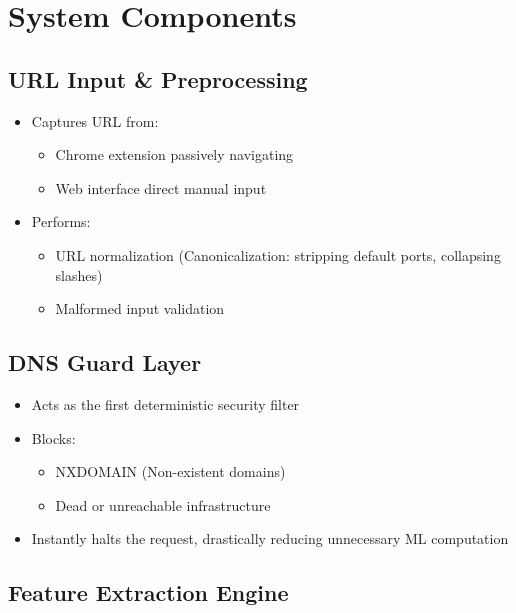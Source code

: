 \section{System Components}

\subsection{URL Input \& Preprocessing}

\begin{itemize}
    \item Captures URL from:
    \begin{itemize}
        \item Chrome extension passively navigating
        \item Web interface direct manual input
    \end{itemize}
    \item Performs:
    \begin{itemize}
        \item URL normalization (Canonicalization: stripping default ports, collapsing slashes)
        \item Malformed input validation
    \end{itemize}
\end{itemize}

\subsection{DNS Guard Layer}

\begin{itemize}
    \item Acts as the first deterministic security filter
    \item Blocks:
    \begin{itemize}
        \item NXDOMAIN (Non-existent domains)
        \item Dead or unreachable infrastructure
    \end{itemize}
    \item Instantly halts the request, drastically reducing unnecessary ML computation \cite{ref3, ref4}
\end{itemize}

\subsection{Feature Extraction Engine}

